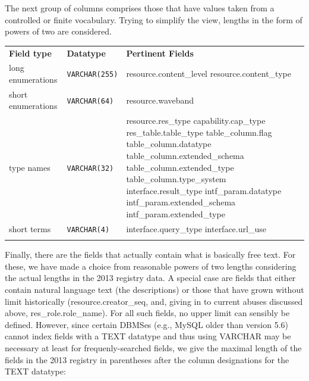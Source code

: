 \documentclass[11pt,a4paper]{ivoa}
\begin{document}
The next group of columns comprises those that have values taken from
a controlled or finite vocabulary.
Trying to simplify the view,
lengths in the form
of powers of two are considered.

\begin{inlinetable}
\begin{tabular}{llp{6cm}}
\sptablerule
\textbf{Field type}&
\textbf{Datatype}&
\textbf{Pertinent Fields}\\
\sptablerule
long enumerations&\texttt{VARCHAR(255)}&resource.content\_level\hfil\break
          resource.content\_type\\
\sptablerule
short enumerations&\texttt{VARCHAR(64)}&
          resource.waveband\\
\sptablerule
type names&\texttt{VARCHAR(32)}&resource.res\_type\hfil\break
          capability.cap\_type\hfil\break
          res\_table.table\_type\hfil\break
          table\_column.flag\hfil\break
          table\_column.datatype\hfil\break
          table\_column.extended\_schema\hfil\break
          table\_column.extended\_type\hfil\break
          table\_column.type\_system\hfil\break
          interface.result\_type\hfil\break
          intf\_param.datatype\hfil\break
          intf\_param.extended\_schema\hfil\break
          intf\_param.extended\_type\\
\sptablerule
short terms&\texttt{VARCHAR(4)}&interface.query\_type\hfil\break
          interface.url\_use\\
\sptablerule
\end{tabular}
\end{inlinetable}


Finally, there are the fields that actually contain what is
basically free text.
For these, we have made a choice from reasonable powers of two lengths 
considering the actual lengths in the 2013 registry data. 
A special case are fields that either contain natural language text (the
descriptions) or those that have grown without limit historically
(resource.creator\_seq, and, giving in to current abuses discussed above,
res\_role.role\_name).  For all such fields, no upper limit can sensibly
be defined.  However, since certain DBMSes (e.g., MySQL older than
version 5.6) cannot index fields with a TEXT datatype and thus using
VARCHAR may be necessary at least for frequenly-searched fields, we give
the maximal length of the fields in the 2013 registry in parentheses after
the column designations for the TEXT datatype:
\end{document}
